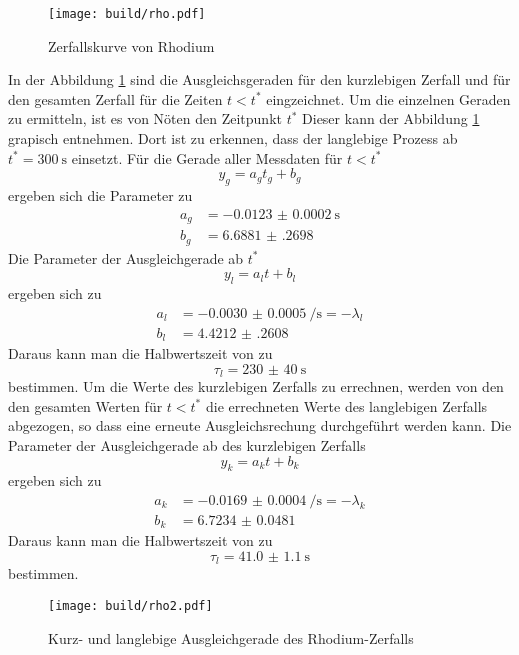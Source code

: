 \begin{figure}
    \centering
    \caption{Zerfallskurve von Rhodium}
    \label{fig:rho}
    \texttt{[image: build/rho.pdf]}
\end{figure}
In der Abbildung \ref{fig:rho} sind die Ausgleichsgeraden für den kurzlebigen Zerfall und für den gesamten Zerfall für die Zeiten $t < t^*$ eingzeichnet.
Um die einzelnen Geraden zu ermitteln, ist es von Nöten den Zeitpunkt $t^*$
Dieser kann der Abbildung \ref{fig:rho} grapisch entnehmen.
Dort ist zu erkennen, dass der langlebige Prozess ab $t^* = \SI{300}{\second}$ einsetzt.
Für die Gerade aller Messdaten für $t < t^*$
\begin{equation}
    y_g = a_g t_g + b_g
\end{equation}
ergeben sich die Parameter zu 
\begin{align*}
    a_g &= \SI{-0.0123(2)}{\second} \\
    b_g &= \num{6.6881(2698)}
\end{align*}
Die Parameter der Ausgleichgerade ab $t^*$
\begin{equation}
    y_l = a_l t + b_l
\end{equation}
ergeben sich zu
\begin{align*}
    a_l &= \SI{-0.0030(5)}{\per\second} = - \lambda_l \\
    b_l &= \num{4.4212(2608)}
\end{align*}
Daraus kann man die Halbwertszeit von  zu 
\begin{equation*}
    \tau_l = \SI{230(40)}{\second}
\end{equation*}
bestimmen.
Um die Werte des kurzlebigen Zerfalls zu errechnen, werden von den den gesamten Werten für $t < t^*$ die errechneten Werte des langlebigen Zerfalls abgezogen,
so dass eine erneute Ausgleichsrechung durchgeführt werden kann.
Die Parameter der Ausgleichgerade ab des kurzlebigen Zerfalls
\begin{equation}
    y_k = a_k t + b_k
\end{equation}
ergeben sich zu
\begin{align*}
    a_k &= \SI{-0.0169(4)}{\per\second} = - \lambda_k \\
    b_k &= \num{6.7234(481)}
\end{align*}
Daraus kann man die Halbwertszeit von  zu 
\begin{equation*}
    \tau_l = \SI{41.0(11)}{\second}
\end{equation*}
bestimmen.
\begin{figure}
    \centering
    \caption{Kurz- und langlebige Ausgleichgerade des Rhodium-Zerfalls}
    \label{fig:rhoaang}
    \texttt{[image: build/rho2.pdf]}
\end{figure}
